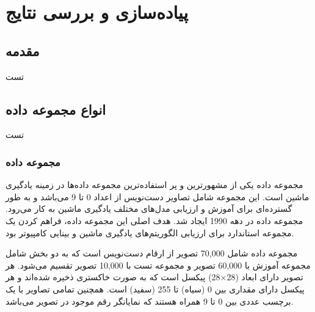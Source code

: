 \chapter{پیاده‌سازی و بررسی نتایج}

\section{مقدمه}
تست


\section{انواع مجموعه داده}
تست

\subsection{
مجموعه داده
}
مجموعه داده
یکی از مشهورترین و پر استفاده‌ترین مجموعه داده‌ها در زمینه یادگیری ماشین است. این مجموعه شامل تصاویر دست‌نویس از اعداد 0 تا 9 می‌باشد و به طور گسترده‌ای برای آموزش و ارزیابی مدل‌های مختلف یادگیری ماشین به کار می‌رود.
مجموعه داده
در دهه 1990 ایجاد شد. هدف اصلی این مجموعه داده، فراهم کردن یک مجموعه استاندارد برای ارزیابی الگوریتم‌های یادگیری ماشین و بینایی کامپیوتر بود.

مجموعه داده
شامل 70,000 تصویر از ارقام دست‌نویس است که به دو بخش شامل مجموعه آموزش با 60,000 تصویر و مجموعه تست با 10,000 تصویر تقسیم می‌شود. هر تصویر دارای ابعاد
(28$\times$28)
پیکسل است که به صورت خاکستری%
ذخیره شده‌اند و هر پیکسل دارای مقداری بین 0 (سیاه) تا 255 (سفید) است. همچنین تمامی تصاویر با یک برچسب عددی بین 0 تا 9 همراه هستند که نمایانگر رقم موجود در تصویر می‌باشد.

